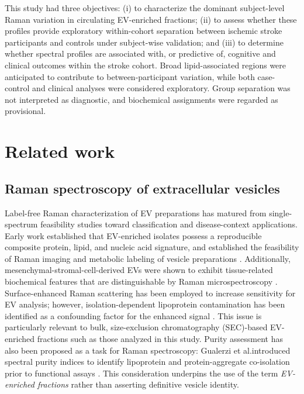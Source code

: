\documentclass[preprint,12pt]{elsarticle}
\begin{document}
This study had three objectives: (i) to characterize the dominant subject-level Raman variation in circulating EV-enriched fractions; (ii) to assess whether these profiles provide exploratory within-cohort separation between ischemic stroke participants and controls under subject-wise validation; and (iii) to determine whether spectral profiles are associated with, or predictive of, cognitive and clinical outcomes within the stroke cohort. Broad lipid-associated regions were anticipated to contribute to between-participant variation, while both case-control and clinical analyses were considered exploratory. Group separation was not interpreted as diagnostic, and biochemical assignments were regarded as provisional.

\section{Related work}
\label{sec:related_work}

\color{teal}
\subsection{Raman spectroscopy of extracellular vesicles} \label{subsec:related_ev_raman}

Label-free Raman characterization of EV preparations has matured from single-spectrum feasibility studies toward classification and disease-context applications. Early work established that EV-enriched isolates possess a reproducible composite protein, lipid, and nucleic acid signature, and established the feasibility of Raman imaging and metabolic labeling of vesicle preparations \cite{horgan2020}. Additionally, mesenchymal-stromal-cell-derived EVs were shown to exhibit tissue-related biochemical features that are distinguishable by Raman microspectroscopy \cite{gualerzi2017}. Surface-enhanced Raman scattering has been employed to increase sensitivity for EV analysis; however, isolation-dependent lipoprotein contamination has been identified as a confounding factor for the enhanced signal \cite{koster2021}. This issue is particularly relevant to bulk, size-exclusion chromatography (SEC)-based EV-enriched fractions such as those analyzed in this study. Purity assessment has also been proposed as a task for Raman spectroscopy: Gualerzi et al.introduced spectral purity indices to identify lipoprotein and protein-aggregate co-isolation prior to functional assays \cite{gualerzi2019}. This consideration underpins the use of the term \emph{EV-enriched fractions} rather than asserting definitive vesicle identity.
\end{document}
